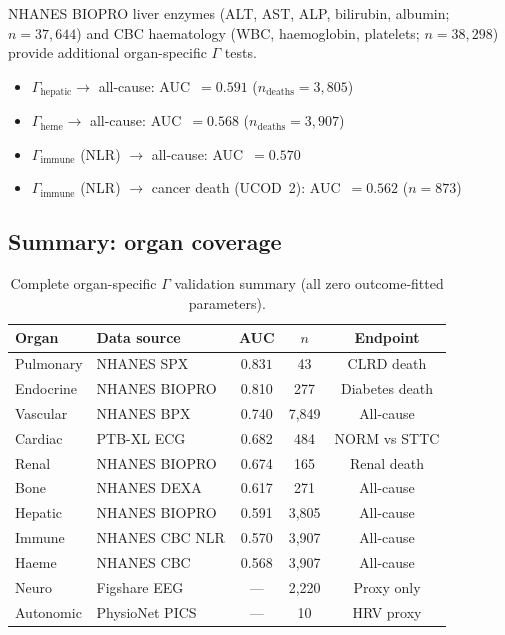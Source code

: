 \documentclass[aps,pre,twocolumn,superscriptaddress,floatfix]{revtex4-2}
\begin{document}
NHANES BIOPRO liver enzymes (ALT, AST, ALP, bilirubin, albumin;
$n = 37{,}644$) and CBC haematology (WBC, haemoglobin, platelets;
$n = 38{,}298$) provide additional organ-specific $\Gamma$ tests.

\begin{itemize}
  \item $\Gamma_{\text{hepatic}} \to$ all-cause:
    AUC~$= 0.591$ ($n_{\text{deaths}} = 3{,}805$)
  \item $\Gamma_{\text{heme}} \to$ all-cause:
    AUC~$= 0.568$ ($n_{\text{deaths}} = 3{,}907$)
  \item $\Gamma_{\text{immune}}$ (NLR) $\to$ all-cause:
    AUC~$= 0.570$
  \item $\Gamma_{\text{immune}}$ (NLR) $\to$ cancer death (UCOD~2):
    AUC~$= 0.562$ ($n = 873$)
\end{itemize}


\subsection{Summary: organ coverage}
\label{sec:organ-summary}

\begin{table}[h]
\centering
\caption{Complete organ-specific $\Gamma$ validation summary
  (all zero outcome-fitted parameters).}
\label{tab:organ-summary}
\begin{tabular}{llccc}
\toprule
Organ & Data source & AUC & $n$ & Endpoint \\
\midrule
Pulmonary   & NHANES SPX      & $\mathbf{0.831}$ & 43   & CLRD death \\
Endocrine   & NHANES BIOPRO   & 0.810 & 277  & Diabetes death \\
Vascular    & NHANES BPX      & 0.740 & 7{,}849 & All-cause \\
Cardiac     & PTB-XL ECG      & 0.682 & 484  & NORM vs STTC \\
Renal       & NHANES BIOPRO   & 0.674 & 165  & Renal death \\
Bone        & NHANES DEXA     & 0.617 & 271  & All-cause \\
Hepatic     & NHANES BIOPRO   & 0.591 & 3{,}805 & All-cause \\
Immune      & NHANES CBC NLR  & 0.570 & 3{,}907 & All-cause \\
Haeme       & NHANES CBC      & 0.568 & 3{,}907 & All-cause \\
Neuro       & Figshare EEG    & ---   & 2{,}220 & Proxy only \\
Autonomic   & PhysioNet PICS  & ---   & 10   & HRV proxy \\
\bottomrule
\end{tabular}
\end{table}
\end{document}
